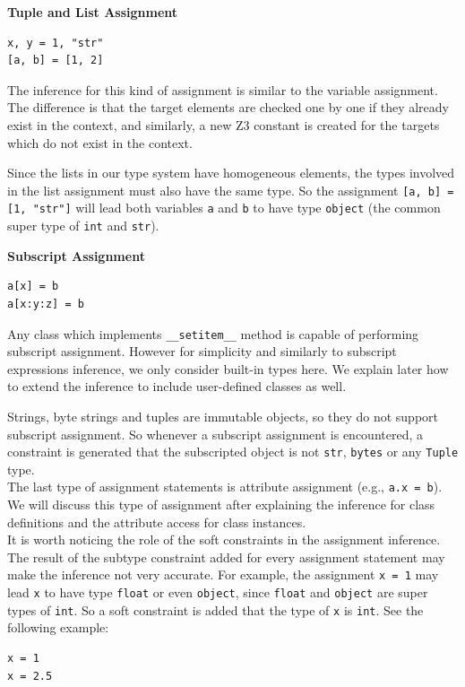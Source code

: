 \textbf{Tuple and List Assignment}
\begin{lstlisting}
x, y = 1, "str"
[a, b] = [1, 2]
\end{lstlisting}

The inference for this kind of assignment is similar to the variable assignment. The difference is that the target elements are checked one by one if they already exist in the context, and similarly, a new Z3 constant is created for the targets which do not exist in the context.

Since the lists in our type system have homogeneous elements, the types involved in the list assignment must also have the same type. So the assignment \lstinline|[a, b] = [1, "str"]| will lead both variables \lstinline|a| and \lstinline|b| to have type \lstinline|object| (the common super type of \lstinline|int| and \lstinline|str|).

\textbf{Subscript Assignment}
\begin{lstlisting}
a[x] = b
a[x:y:z] = b
\end{lstlisting}
Any class which implements \lstinline|__setitem__| method is capable of performing subscript assignment. However for simplicity and similarly to subscript expressions inference, we only consider built-in types here. We explain later how to extend the inference to include user-defined classes as well.

Strings, byte strings and tuples are immutable objects, so they do not support subscript assignment. So whenever a subscript assignment is encountered, a constraint is generated that the subscripted object is not \lstinline|str|, \lstinline|bytes| or any \lstinline|Tuple| type.\\

The last type of assignment statements is attribute assignment (e.g., \lstinline|a.x = b|). We will discuss this type of assignment after explaining the inference for class definitions and the attribute access for class instances.\\

It is worth noticing the role of the soft constraints in the assignment inference. The result of the subtype constraint added for every assignment statement may make the inference not very accurate. For example, the assignment \lstinline|x = 1| may lead \lstinline|x| to have type \lstinline|float| or even \lstinline|object|, since \lstinline|float| and \lstinline|object| are super types of \lstinline|int|. So a soft constraint is added that the type of \lstinline|x| is \lstinline|int|. See the following example:
\begin{lstlisting}
x = 1
x = 2.5
\end{lstlisting}

